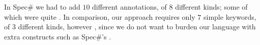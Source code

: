 In Spec\# we had to add $10$ different annotations, of $8$ different kinds; some of which were quite . In comparison, our approach requires only $7$ simple keywords, of $3$ different kinds, however , since we do not want to burden our language with extra constructs such as Spec\#'s \Q@expose@.

%

